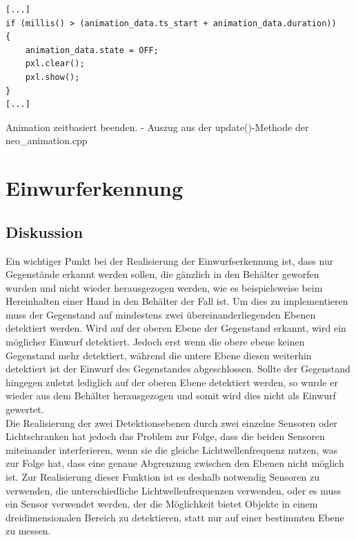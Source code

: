     \begin{listing}
        \begin{verbatim}
[...]
if (millis() > (animation_data.ts_start + animation_data.duration)) 
{
    animation_data.state = OFF;
    pxl.clear();
    pxl.show();
} 
[...]
        \end{verbatim}
        \caption{Animation zeitbasiert beenden. - Auszug aus der update()-Methode der neo\_animation.cpp}
        \label{lst:animation_3}
    \end{listing}


\section{Einwurferkennung}
    \subsection{Diskussion}
        Ein wichtiger Punkt bei der Realisierung der Einwurfserkennung ist, dass nur Gegenstände erkannt werden sollen, die gänzlich in den Behälter geworfen wurden und nicht wieder herausgezogen werden, wie es beispielsweise beim Hereinhalten einer Hand in den Behälter der Fall ist. Um dies zu implementieren muss der Gegenstand auf mindestens zwei übereinanderliegenden Ebenen detektiert werden. Wird auf der oberen Ebene der Gegenstand erkannt, wird ein möglicher Einwurf detektiert. Jedoch erst wenn die obere ebene keinen Gegenstand mehr detektiert, während die untere Ebene diesen weiterhin detektiert ist der Einwurf des Gegenstandes abgeschlossen. Sollte der Gegenstand hingegen zuletzt lediglich auf der oberen Ebene detektiert werden, so wurde er wieder aus dem Behälter herausgezogen und somit wird dies nicht als Einwurf gewertet.\\

        Die Realisierung der zwei Detektionsebenen durch zwei einzelne Sensoren oder Lichtschranken hat jedoch das Problem zur Folge, dass die beiden Sensoren miteinander interferieren, wenn sie die gleiche Lichtwellenfrequenz nutzen, was zur Folge hat, dass eine genaue Abgrenzung zwischen den Ebenen nicht möglich ist. Zur Realisierung dieser Funktion ist es deshalb notwendig Sensoren zu verwenden, die unterschiedliche Lichtwellenfrequenzen verwenden, oder es muss ein Sensor verwendet werden, der die Möglichkeit bietet Objekte in einem dreidimensionalen Bereich zu detektieren, statt nur auf einer bestimmten Ebene zu messen.\\

